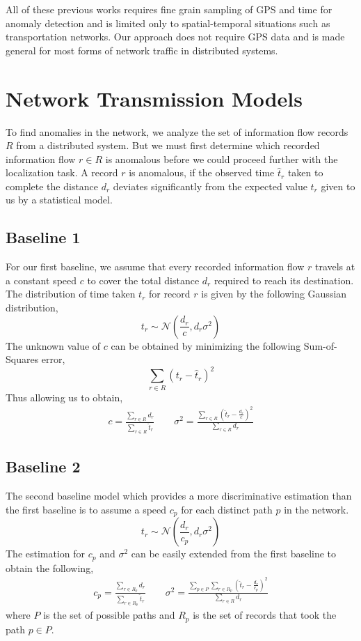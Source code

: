 \documentclass[conference]{IEEEtran.1.8}
\begin{document}
All of these previous works \cite{Chawla2012, Ge2011, Liu2011, Pan2013, Zhang2011, Zhang2012} requires fine grain sampling of GPS and time for anomaly detection and is limited only to spatial-temporal situations such as transportation networks. Our approach does not require GPS data and is made general for most forms of network traffic in distributed systems.

\section{Network Transmission Models}
\label{sec:models}

To find anomalies in the network, we analyze the set of information flow records $R$ from a distributed system. But we must first determine which recorded information flow $r \in R$ is anomalous before we could proceed further with the localization task. A record $r$ is anomalous, if the observed time $\hat{t}_r$ taken to complete the distance $d_r$ deviates significantly from the expected value $t_r$ given to us by a statistical model.

\subsection{Baseline 1}

For our first baseline, we assume that every recorded information flow $r$ travels at a constant speed $c$ to cover the total distance $d_r$ required to reach its destination. The distribution of time taken $t_r$ for record $r$ is given by the following Gaussian distribution,
\[ t_r \sim \mathcal{N} \left( \frac{d_r}{c}, d_r \sigma^2 \right) \]
The unknown value of $c$ can be obtained by minimizing the following Sum-of-Squares error,
\[ \sum_{r \in R} (t_r - \hat{t}_r)^2 \]
Thus allowing us to obtain,
\begin{gather*}
	c = \frac{\sum_{r \in R} d_r}{\sum_{r \in R} \hat{t}_r} \qquad
    \sigma^2 = \frac{ \sum_{r \in R} \left( \hat{t}_r - \frac{d_r}{c} \right)^2 }{ \sum_{r \in R} d_r }
\end{gather*}

\subsection{Baseline 2}

The second baseline model which provides a more discriminative estimation than the first baseline is to assume a speed $c_p$ for each distinct path $p$ in the network.
\[ t_r \sim \mathcal{N} \left( \frac{d_r}{c_p}, d_r \sigma^2 \right) \]
The estimation for $c_p$ and $\sigma^2$ can be easily extended from the first baseline to obtain the following,
\begin{gather*}
	c_p = \frac{\sum_{r \in R_p} d_r}{\sum_{r \in R_p} \hat{t}_r} \qquad
    \sigma^2 = \frac{ \sum_{p \in P} \sum_{r \in R_p} \left( \hat{t}_r - \frac{d_r}{c_p} \right)^2 }{ \sum_{r \in R} d_r }
\end{gather*}
where $P$ is the set of possible paths and $R_p$ is the set of records that took the path $p \in P$.
\end{document}
